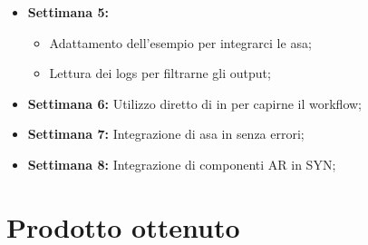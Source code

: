 \begin{itemize}
\begin{itemize}
        \end{itemize}
    \item \textbf{Settimana 5:} 
        \begin{itemize}
            \item Adattamento dell'esempio \arplug per integrarci le asa;
            \item Lettura dei logs per filtrarne gli output;
        \end{itemize}
    \item \textbf{Settimana 6:} Utilizzo diretto di \arcore in \flutter per capirne il workflow;
    \item \textbf{Settimana 7:} Integrazione di asa in \flutter senza errori;
    \item \textbf{Settimana 8:} Integrazione di componenti AR in SYN;
\end{itemize}
\section{Prodotto ottenuto}
\todo

